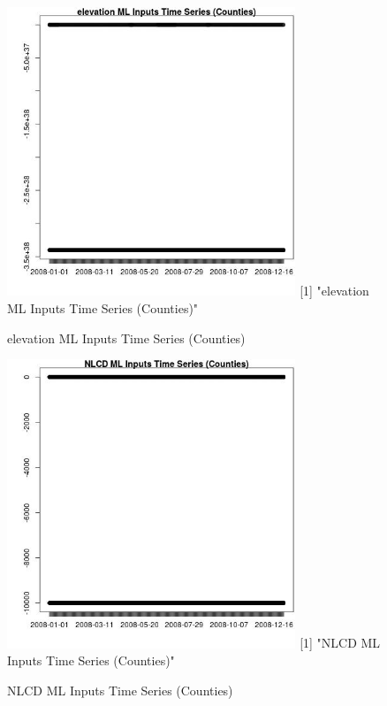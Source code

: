 \begin{figure} 
\centering  
\includegraphics[width=0.77\textwidth]{Code_Outputs/ML_input_report_ML_input_CountyGeometricCentroids_Locations_Dates_part_c_2008-01-01to2008-12-31_elevationTS.jpg} 
[1] "elevation ML Inputs Time Series (Counties)"
\caption{\label{fig:ML_input_report_ML_input_CountyGeometricCentroids_Locations_Dates_part_c_2008-01-01to2008-12-31elevationTS}elevation ML Inputs Time Series (Counties)} 
\end{figure} 
 

\begin{figure} 
\centering  
\includegraphics[width=0.77\textwidth]{Code_Outputs/ML_input_report_ML_input_CountyGeometricCentroids_Locations_Dates_part_c_2008-01-01to2008-12-31_NLCDTS.jpg} 
[1] "NLCD ML Inputs Time Series (Counties)"
\caption{\label{fig:ML_input_report_ML_input_CountyGeometricCentroids_Locations_Dates_part_c_2008-01-01to2008-12-31NLCDTS}NLCD ML Inputs Time Series (Counties)} 
\end{figure} 
 
